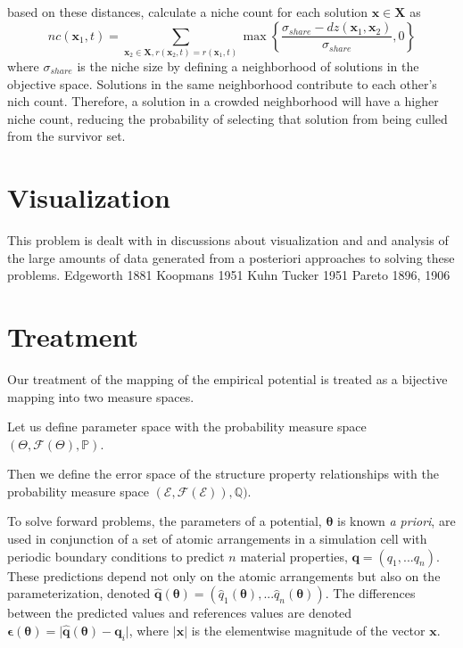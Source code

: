 based on these distances, calculate a niche count for each solution $\bm{x}\in\bm{X}$ as
\begin{equation}
  nc(\bm{x}_1,t)=\sum_{\bm{x}_2\in\bm{X},r(\bm{x}_2,t)=r(\bm{x}_1,t)}
      \max\left\{ \frac{\sigma_{share}-dz(\bm{x}_1,\bm{x}_2)}
                       {\sigma_{share}},0
          \right\}
\end{equation}
where $\sigma_{share}$ is the niche size by defining a neighborhood of solutions in the objective space.  Solutions in the same neighborhood contribute to each other's nich count.  Therefore, a solution in a crowded neighborhood will have a higher niche count, reducing the probability of selecting that solution from being culled from the survivor set.

\section{Visualization}
This problem is dealt with in discussions about visualization and and analysis of the large amounts of data generated from a posteriori approaches to solving these problems.
Edgeworth 1881
Koopmans 1951
Kuhn Tucker 1951
Pareto 1896, 1906
\section{Treatment}

Our treatment of the mapping of the empirical potential is treated as a bijective mapping into two measure spaces.

Let us define parameter space with the probability measure space $(\Theta,\mathcal{F}(\Theta),\mathbb{P})$.

Then we define the error space of the structure property relationships with the probability measure space $(\mathcal{E},\mathcal{F}(\mathcal{E})),\mathbb{Q})$.


To solve forward problems, the parameters of a potential, $\bm{\theta}$ is known \emph{a priori}, are used in conjunction of a set of atomic arrangements in a simulation cell with periodic boundary conditions to predict $n$ material properties, $\bm{q} = (q_1,...q_n)$.  These predictions depend not only on the atomic arrangements but also on the parameterization, denoted
$\bm{\hat{q}}(\bm{\theta}) =
    (\hat{q}_1(\bm{\theta}),...\hat{q}_n(\bm{\theta}))$.
The differences between the predicted values and references values are denoted
$\bm{\epsilon}(\bm{\theta}) =
    \lvert \bm{\hat{q}}(\bm{\theta})
         - \bm{q}_i
    \rvert$,
where $|\bm{x}|$ is the elementwise magnitude of the vector $\bm{x}$.

